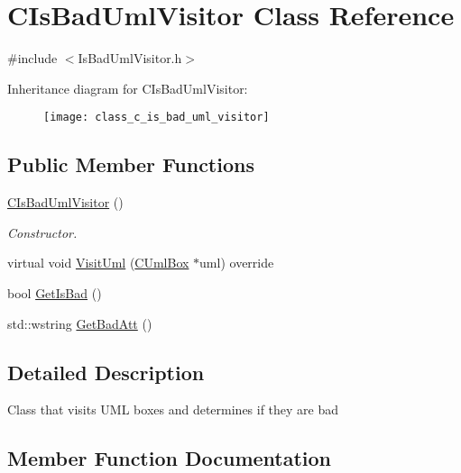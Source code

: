 \hypertarget{class_c_is_bad_uml_visitor}{}\section{C\+Is\+Bad\+Uml\+Visitor Class Reference}
\label{class_c_is_bad_uml_visitor}


{\ttfamily \#include $<$Is\+Bad\+Uml\+Visitor.\+h$>$}

Inheritance diagram for C\+Is\+Bad\+Uml\+Visitor\+:\begin{figure}[H]
\begin{center}
\leavevmode
\texttt{[image: class\_c\_is\_bad\_uml\_visitor]}
\end{center}
\end{figure}
\subsection*{Public Member Functions}
\begin{DoxyCompactItemize}
\item 
\mbox{\label{class_c_is_bad_uml_visitor_a1554051e2140c29947d79c5019e86cc0}} 
\mbox{\hyperlink{class_c_is_bad_uml_visitor_a1554051e2140c29947d79c5019e86cc0}{C\+Is\+Bad\+Uml\+Visitor}} ()
\begin{DoxyCompactList}\small\item\em Constructor. \end{DoxyCompactList}\item 
virtual void \mbox{\hyperlink{class_c_is_bad_uml_visitor_a749753fc1c57d534faf60a016a4fd745}{Visit\+Uml}} (\mbox{\hyperlink{class_c_uml_box}{C\+Uml\+Box}} $\ast$uml) override
\item 
bool \mbox{\hyperlink{class_c_is_bad_uml_visitor_ad7abecc1adc872930e938ef4528fd44e}{Get\+Is\+Bad}} ()
\item 
std\+::wstring \mbox{\hyperlink{class_c_is_bad_uml_visitor_a7e8acbce516233fcb47d8320e6251ceb}{Get\+Bad\+Att}} ()
\end{DoxyCompactItemize}


\subsection{Detailed Description}
Class that visits U\+ML boxes and determines if they are bad 

\subsection{Member Function Documentation}
\mbox{\label{class_c_is_bad_uml_visitor_a7e8acbce516233fcb47d8320e6251ceb}} 
